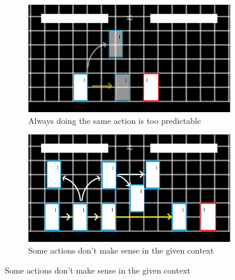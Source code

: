 \begin{figure}[h]
	\centering
	\begin{subfigure}[h]{0.4\textwidth}
		\centering
		\includegraphics[width=\textwidth]{Figures/LearningExample1.png}
		\caption{Always doing the same action is too predictable}
		\label{Learning1}
	\end{subfigure}
	\begin{subfigure}[h]{0.4\textwidth}
		\centering
		\includegraphics[width=\textwidth]{Figures/LearningExample2.png}
		\caption{Some actions don't make sense in the given context}
		\label{Learning2}
	\end{subfigure}
\end{figure}




